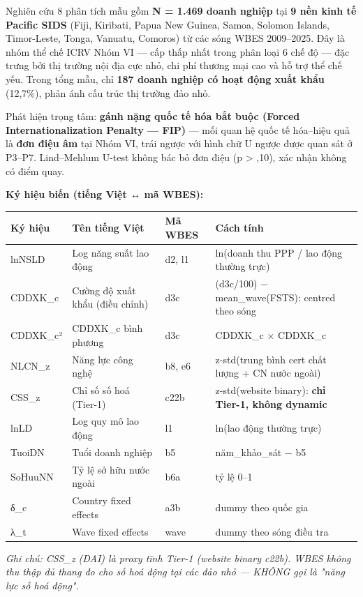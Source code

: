\documentclass[12pt,a4paper]{article}
\begin{document}
Nghiên cứu 8 phân tích mẫu gồm \textbf{N = 1.469 doanh nghiệp} tại
\textbf{9 nền kinh tế Pacific SIDS} (Fiji, Kiribati, Papua New Guinea,
Samoa, Solomon Islands, Timor-Leste, Tonga, Vanuatu, Comoros) từ các
sóng WBES 2009--2025. Đây là nhóm thể chế ICRV Nhóm VI --- cấp thấp nhất
trong phân loại 6 chế độ --- đặc trưng bởi thị trường nội địa cực nhỏ,
chi phí thương mại cao và hỗ trợ thể chế yếu. Trong tổng mẫu, chỉ
\textbf{187 doanh nghiệp có hoạt động xuất khẩu} (12,7\%), phản ánh cấu
trúc thị trường đảo nhỏ.

Phát hiện trọng tâm: \textbf{gánh nặng quốc tế hóa bắt buộc (Forced
Internationalization Penalty --- FIP)} --- mối quan hệ quốc tế hóa--hiệu
quả là \textbf{đơn điệu âm} tại Nhóm VI, trái ngược với hình chữ U ngược
được quan sát ở P3--P7. Lind--Mehlum U-test không bác bỏ đơn điệu (p
\textgreater{} ,10), xác nhận không có điểm quay.

\textbf{Ký hiệu biến (tiếng Việt ↔ mã WBES):}

\begin{longtable}[]{@{}llll@{}}
\toprule\noalign{}
Ký hiệu & Tên tiếng Việt & Mã WBES & Cách tính \\
\midrule\noalign{}
\endhead
\bottomrule\noalign{}
\endlastfoot
lnNSLD & Log năng suất lao động & d2, l1 & ln(doanh thu PPP / lao động
thường trực) \\
CDDXK\_c & Cường độ xuất khẩu (điều chỉnh) & d3c & (d3c/100) −
mean\_wave(FSTS): centred theo sóng \\
CDDXK\_c² & CDDXK\_c bình phương & d3c & CDDXK\_c × CDDXK\_c \\
NLCN\_z & Năng lực công nghệ & b8, e6 & z-std(trung bình cert chất lượng
+ CN nước ngoài) \\
CSS\_z & Chỉ số số hoá (Tier-1) & c22b & z-std(website binary):
\textbf{chỉ Tier-1, không dynamic} \\
lnLD & Log quy mô lao động & l1 & ln(lao động thường trực) \\
TuoiDN & Tuổi doanh nghiệp & b5 & năm\_khảo\_sát − b5 \\
SoHuuNN & Tỷ lệ sở hữu nước ngoài & b6a & tỷ lệ 0--1 \\
δ\_c & Country fixed effects & a3b & dummy theo quốc gia \\
λ\_t & Wave fixed effects & wave & dummy theo sóng điều tra \\
\end{longtable}

\emph{Ghi chú: CSS\_z (DAI) là proxy tĩnh Tier-1 (website binary c22b).
WBES không thu thập đủ thang đo cho số hoá động tại các đảo nhỏ ---
KHÔNG gọi là "năng lực số hoá động".}
\end{document}
